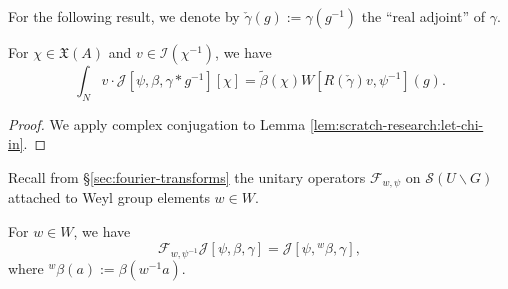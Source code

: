 For the following result, we denote by $\check{\gamma}(g) := \gamma(g^{-1})$ the ``real adjoint'' of $\gamma$.
\begin{lemma}\label{lem:standard:chi-in-mathfrakxa}
  For $\chi \in \mathfrak{X}(A)$ and $v \in \mathcal{I}(\chi^{-1})$, we have
  \begin{equation}\label{eq:mathc-beta-gamm-1}
    \int_{N}
    v \cdot
    \mathcal{J}[\psi,\beta,\gamma \ast g^{-1}][\chi]
    =
    \tilde{\beta}(\chi)
    W[R(\check{\gamma}) v, \psi^{-1}](g).
  \end{equation}
\end{lemma}
\begin{proof}
  We apply complex conjugation to Lemma \ref{lem:scratch-research:let-chi-in}.
\end{proof}

Recall from \S\ref{sec:fourier-transforms} the unitary operators $\mathcal{F}_{w,\psi}$ on $\mathcal{S}(U \backslash G)$ attached to Weyl group elements $w \in W$.
\begin{lemma}\label{lem:sub-gln:each-psi-beta-1}
  For $w \in W$, we have
  \begin{equation*}
    \mathcal{F}_{w,\psi^{-1}} \mathcal{J}[\psi,\beta,\gamma] = \mathcal{J}[{\psi,{}^w \beta,\gamma}],
  \end{equation*}
  where ${}^w \beta(a) := \beta(w^{-1} a)$.
\end{lemma}
